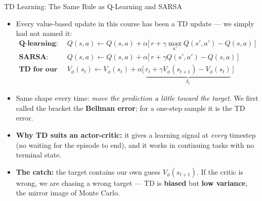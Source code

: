 \begin{frame}{TD Learning: The Same Rule as Q-Learning and SARSA}
\begin{itemize}
    \item Every value-based update in this course has been a TD update --- we simply had not named it:
    \begin{align*}
        \textbf{Q-learning:}\quad & Q(s,a) \leftarrow Q(s,a) + \alpha \big[\, r + \gamma \max_{a'} Q(s',a') - Q(s,a) \,\big] \\
        \textbf{SARSA:}\quad & Q(s,a) \leftarrow Q(s,a) + \alpha \big[\, r + \gamma Q(s',a') - Q(s,a) \,\big] \\
        \textbf{TD for our critic:}\quad & V_\phi(s_t) \leftarrow V_\phi(s_t) + \alpha \big[\, \underbrace{r_t + \gamma V_\phi(s_{t+1}) - V_\phi(s_t)}_{\delta_t} \,\big]
    \end{align*}
    \item Same shape every time: \emph{move the prediction a little toward the target}. We first called the bracket the \textbf{Bellman error}; for a one-step sample it is the TD error.
    \pause
    \item \textbf{Why TD suits an actor-critic:} it gives a learning signal at \emph{every} timestep (no waiting for the episode to end), and it works in continuing tasks with no terminal state.
    \item \textbf{The catch:} the target contains our own guess $V_\phi(s_{t+1})$. If the critic is wrong, we are chasing a wrong target --- TD is \textbf{biased} but \textbf{low variance}, the mirror image of Monte Carlo.
\end{itemize}
\end{frame}


